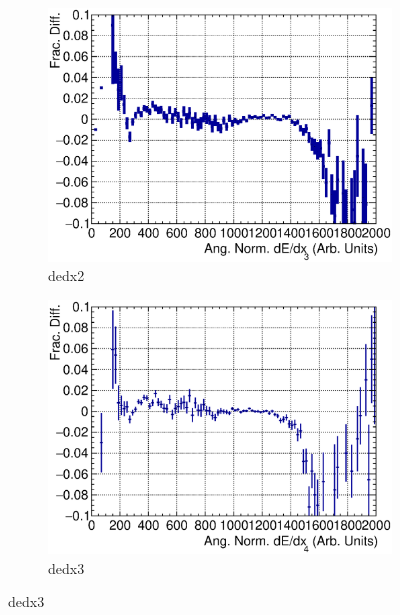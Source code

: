 \begin{figure}[t]
      \\
      \begin{subfigure}{\dbfigwid\textwidth}
           \includegraphics[width=\textwidth]{figures/sel/fig53c.eps}
           \caption{dedx2}
           \label{subfig:dedx2}
      \end{subfigure}
      \begin{subfigure}{\dbfigwid\textwidth}
           \includegraphics[width=\textwidth]{figures/sel/fig53d.eps}
           \caption{dedx3}
           \label{subfig:dedx3}
      \end{subfigure}

\end{figure}
